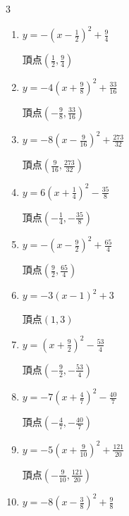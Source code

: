 \begin{multicols}{3}
\begin{enumerate}
        $\displaystyle 頂点\left( -\frac{1}{14} , -\frac{55}{28} \right)$

  \item $\displaystyle y=-\left( x-\frac{1}{2}\right)^{2}+\frac{9}{4}$

        $\displaystyle 頂点\left( \frac{1}{2} , \frac{9}{4} \right)$

  \item $\displaystyle y=-4\left( x+\frac{9}{8}\right)^{2}+\frac{33}{16}$

        $\displaystyle 頂点\left( -\frac{9}{8} , \frac{33}{16} \right)$

  \item $\displaystyle y=-8\left( x-\frac{9}{16}\right)^{2}+\frac{273}{32}$

        $\displaystyle 頂点\left( \frac{9}{16} , \frac{273}{32} \right)$

  \item $\displaystyle y=6\left( x+\frac{1}{4}\right)^{2}-\frac{35}{8}$

        $\displaystyle 頂点\left( -\frac{1}{4} , -\frac{35}{8} \right)$

  \item $\displaystyle y=-\left( x-\frac{9}{2}\right)^{2}+\frac{65}{4}$

        $\displaystyle 頂点\left( \frac{9}{2} , \frac{65}{4} \right)$

  \item $\displaystyle y=-3\left( x-1\right)^{2}+3$

        $\displaystyle 頂点\left( 1 , 3 \right)$

\columnbreak %

\resetques

  \item $\displaystyle y=\left( x+\frac{9}{2}\right)^{2}-\frac{53}{4}$

        $\displaystyle 頂点\left( -\frac{9}{2} , -\frac{53}{4} \right)$

  \item $\displaystyle y=-7\left( x+\frac{4}{7}\right)^{2}-\frac{40}{7}$

        $\displaystyle 頂点\left( -\frac{4}{7} , -\frac{40}{7} \right)$

  \item $\displaystyle y=-5\left( x+\frac{9}{10}\right)^{2}+\frac{121}{20}$

        $\displaystyle 頂点\left( -\frac{9}{10} , \frac{121}{20} \right)$

  \item $\displaystyle y=-8\left( x-\frac{3}{8}\right)^{2}+\frac{9}{8}$


\end{enumerate}
\end{multicols}
